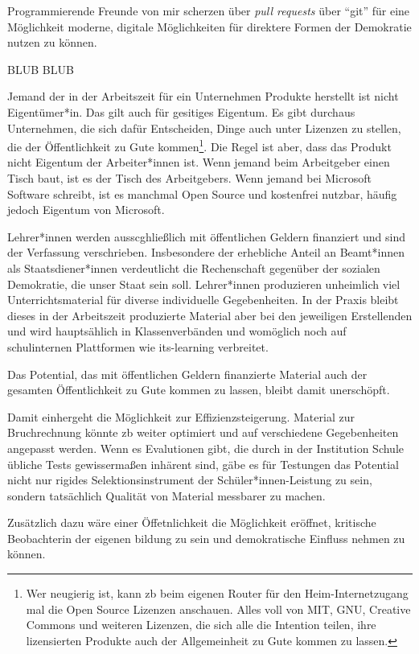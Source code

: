 Programmierende Freunde von mir scherzen über \emph{pull requests} über \enquote{git} für eine Möglichkeit moderne, digitale Möglichkeiten für direktere Formen der Demokratie nutzen zu können.



BLUB BLUB

Jemand der in der Arbeitszeit für ein Unternehmen Produkte herstellt ist nicht Eigentümer*in. Das gilt auch für gesitiges Eigentum. Es gibt durchaus Unternehmen, die sich dafür Entscheiden, Dinge auch unter Lizenzen zu stellen, die der Öffentlichkeit zu Gute kommen\footnote{
    Wer neugierig ist, kann \gls{zb} beim eigenen Router für den Heim-Internetzugang mal die Open Source Lizenzen anschauen. Alles voll von MIT, GNU, Creative Commons und weiteren Lizenzen, die sich alle die Intention teilen, ihre lizensierten Produkte auch der Allgemeinheit zu Gute kommen zu lassen.
}. Die Regel ist aber, dass das Produkt nicht Eigentum der Arbeiter*innen ist. Wenn jemand beim Arbeitgeber einen Tisch baut, ist es der Tisch des Arbeitgebers. Wenn jemand bei Microsoft Software schreibt, ist es manchmal Open Source und kostenfrei nutzbar, häufig jedoch Eigentum von Microsoft.

Lehrer*innen werden ausscghließlich mit öffentlichen Geldern finanziert und sind der Verfassung verschrieben. Insbesondere der erhebliche Anteil an Beamt*innen als Staatsdiener*innen verdeutlicht die Rechenschaft gegenüber der sozialen Demokratie, die unser Staat sein soll. 
Lehrer*innen produzieren unheimlich viel Unterrichtsmaterial für diverse individuelle Gegebenheiten. In der Praxis bleibt dieses in der Arbeitszeit produzierte Material aber bei den jeweiligen Erstellenden und wird hauptsählich in Klassenverbänden und womöglich noch auf schulinternen Plattformen wie its-learning verbreitet. 

Das Potential, das mit öffentlichen Geldern finanzierte Material auch der gesamten Öffentlichkeit zu Gute kommen zu lassen, bleibt damit unerschöpft.

Damit einhergeht die Möglichkeit zur Effizienzsteigerung. Material zur Bruchrechnung könnte \gls{zb} weiter optimiert und auf verschiedene Gegebenheiten angepasst werden. Wenn es Evalutionen gibt, die durch in der Institution Schule übliche Tests gewissermaßen inhärent sind, gäbe es für Testungen das Potential nicht nur rigides Selektionsinstrument der Schüler*innen-Leistung zu sein, sondern tatsächlich Qualität von Material messbarer zu machen. 

Zusätzlich dazu wäre einer Öffetnlichkeit die Möglichkeit eröffnet, kritische Beobachterin der eigenen bildung zu sein und demokratische Einfluss nehmen zu können. 


